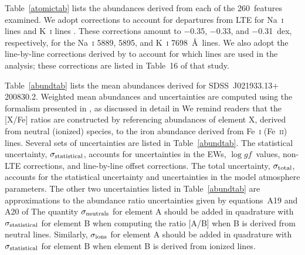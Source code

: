 \documentclass[useAMS,usenatbib,usegraphicx]{mn2e}
\def\loggf{$\log gf$}
\def\seg{\mbox{SDSS~J021933.13$+$200830.2}}
\begin{document}
Table~\ref{atomictab} lists the abundances
derived from each of the 260~features examined.
We adopt corrections
to account for departures from LTE
for Na~\textsc{i} lines \citep{lind11} and
K~\textsc{i} lines \citep{takeda02}.
These corrections amount to 
$-$0.35, $-$0.33, and $-$0.31~dex, respectively,
for the Na~\textsc{i} 5889, 5895, and 
K~\textsc{i} 7698~\AA\ lines.
We also adopt the line-by-line corrections 
derived by \citet{roederer14} to account for 
which lines are used in the analysis;
these corrections are listed in Table~16 of that study.

Table~\ref{abundtab} lists the mean abundances
derived for \seg.
Weighted mean abundances and uncertainties are computed using the
formalism presented in \citet{mcwilliam95},
as discussed in detail in \citeauthor{roederer14} %
We remind readers that the [X/Fe] ratios are constructed
by referencing abundances of element X,
derived from neutral (ionized) species, to the 
iron abundance derived from Fe~\textsc{i} (Fe~\textsc{ii}) lines.
Several sets of uncertainties are listed in Table~\ref{abundtab}.
The statistical uncertainty, $\sigma_{\rm statistical}$,
accounts for uncertainties in the EWs, \loggf\ values,
non-LTE corrections, and line-by-line offset
corrections.
The total uncertainty, $\sigma_{\rm total}$,
accounts for the statistical uncertainty and
uncertainties in the model atmosphere parameters.
The other two uncertainties listed in
Table~\ref{abundtab}
are approximations to the abundance ratio uncertainties
given by equations~A19 and A20 of \citeauthor{mcwilliam95} %
The quantity $\sigma_{\rm neutrals}$ for element A
should be added in quadrature with $\sigma_{\rm statistical}$ for
element B when computing the ratio [A/B] when B is
derived from neutral lines.
Similarly, $\sigma_{\rm ions}$ for element A
should be added in quadrature with $\sigma_{\rm statistical}$ for
element B when element B is derived from ionized lines.
\end{document}
